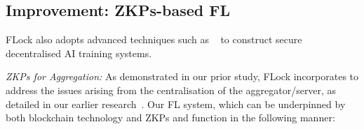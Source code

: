 \documentclass[conference]{IEEEtran}
\begin{document}
\subsection{\FL Improvement: ZKPs-based FL} 

FLock also adopts advanced techniques such as \ZKP~\cite{sasson2014zerocash, groth2016size} to construct secure decentralised AI training systems.


\textit{ZKPs for \FL Aggregation:} As demonstrated in our prior study, FLock incorporates \ZKP to address the issues arising from the centralisation of the \FL aggregator/server, as detailed in our earlier research~\cite{wang2023zkfl}.  Our FL system, which can be underpinned by both blockchain technology and ZKPs and function in the following manner:
\end{document}
